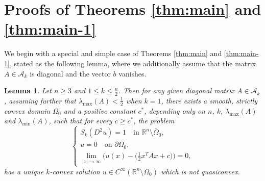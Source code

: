 \documentclass[reqno]{amsart}
\newtheorem{lemma}[theorem]{Lemma}
\theoremstyle{remark}
\theoremstyle{definition}
\numberwithin{equation}{section}
\begin{document}
\section{Proofs of Theorems \ref{thm:main} and \ref{thm:main-1}}\label{sec:proof}
We begin with a special and simple case of Theorems \ref{thm:main} and \ref{thm:main-1}, stated as the following lemma, where we additionally assume that the matrix $A\in\mathcal{A}_k$ is diagonal and the vector $b$ vanishes.

\begin{lemma}\label{lem:AIb0}
	Let $n\geq3$ and $1\leq k \leq \frac{n}{2}$. Then for any given diagonal matrix $A\in\mathcal{A}_k$, assuming further that $\lambda_{\mathrm{max}}(A)<\frac{1}{2} $ when $k=1$, there exists a smooth, strictly convex domain $\Omega_0$ and a positive   constant $c^*$, depending only on $n$, $k$, $\lambda_{\mathrm{max}}(A)$ and $\lambda_{\mathrm{min}}(A)$, such that for every $c\geq c^*$, the problem 
	\begin{equation*}
	\begin{cases}
		S_k(D^2u)=1  \quad\text{in }\mathbb{R}^n\setminus\bar\Omega_0, \\
		u=0  \quad\text{on }\partial\Omega_0, \\
		\lim\limits_{|x|\to\infty} \big(u(x)-\big(\frac{1}{2}x^TAx+c\big)\big)=0,
	    \end{cases}
\end{equation*}
	has a unique $k$-convex solution $u\in C^\infty(\mathbb{R}^n\setminus\Omega_0)$ which is not quasiconvex.
\end{lemma}
\end{document}

